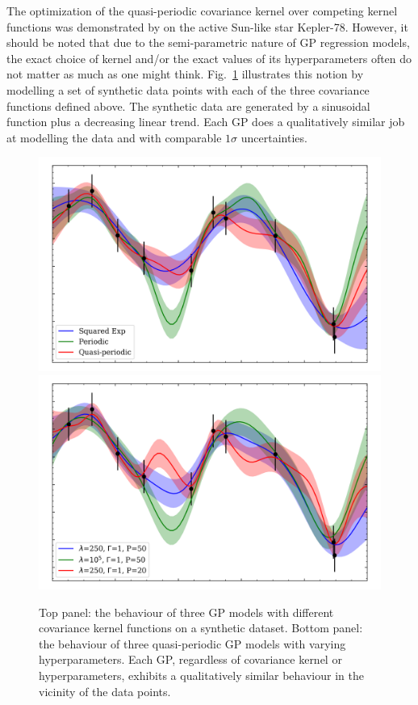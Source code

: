 The optimization of the quasi-periodic covariance kernel over competing kernel functions
was demonstrated by \cite{grunblatt15} on the active Sun-like star Kepler-78. However, it
should be noted that due to the semi-parametric nature of GP regression models, the exact
choice of kernel and/or the exact values of its hyperparameters often do not matter as
much as one might think. Fig.~\ref{fig:exactgp} illustrates this notion by modelling a
set of synthetic data points with each of the three covariance functions defined above.
The synthetic data are generated by a sinusoidal function plus a decreasing linear trend. 
Each GP does a qualitatively similar job at modelling the data and with comparable $1\sigma$
uncertainties. \\

\begin{figure}
  \centering
  \includegraphics[width=0.8\hsize]{figures/gpkernels.png}
  \includegraphics[width=0.8\hsize]{figures/gpkernelvalues.png}
  \caption[Behaviour of GPs with different covariance kernels and hyperparameters.]
          {Top panel: the behaviour of three GP models with different covariance
            kernel functions on a synthetic dataset. Bottom panel: the behaviour of three
            quasi-periodic GP models with varying hyperparameters. Each GP, regardless of
            covariance kernel or hyperparameters, exhibits
            a qualitatively similar behaviour in the vicinity of the data points.}
          \label{fig:exactgp}
\end{figure}
  
